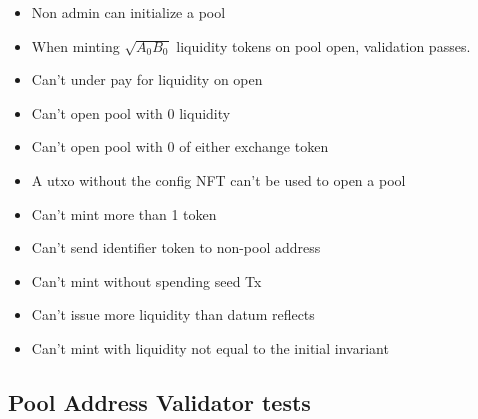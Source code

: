 \documentclass{article}
\begin{document}
\begin{itemize}
	\item Non admin can initialize a pool
	\item When minting $\sqrt{A_0B_0}$ liquidity tokens on pool open, validation passes.
	\item Can't under pay for liquidity on open
	\item Can't open pool with 0 liquidity
	\item Can't open pool with 0 of either exchange token
	\item A utxo without the config NFT can't be used to open a pool
	\item Can't mint more than 1 token
	\item Can't send identifier token to non-pool address
	\item Can't mint without spending seed Tx
	\item Can't issue more liquidity than datum reflects
	\item Can't mint with liquidity not equal to the initial invariant
\end{itemize}

\subsection*{Pool Address Validator tests}
\end{document}
